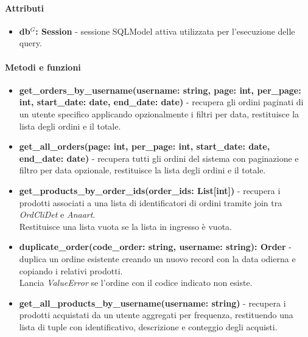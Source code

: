 \paragraph{Attributi}
\begin{itemize}
	\item \textbf{db$^G$: Session} - sessione SQLModel attiva utilizzata per l'esecuzione delle query.
\end{itemize}

\paragraph{Metodi e funzioni}
\begin{itemize}
	\item \textbf{get\_orders\_by\_username(username: string, page: int, per\_page: int, start\_date: date, end\_date: date)} - recupera gli ordini paginati di un utente specifico applicando opzionalmente i filtri per data, restituisce la lista degli ordini e il totale.
	\item \textbf{get\_all\_orders(page: int, per\_page: int, start\_date: date, end\_date: date)} - recupera tutti gli ordini del sistema con paginazione e filtro per data opzionale, restituisce la lista degli ordini e il totale.
	\item \textbf{get\_products\_by\_order\_ids(order\_ids: List[int])} - recupera i prodotti associati a una lista di identificatori di ordini tramite join tra \textit{OrdCliDet} e \textit{Anaart}.\\
	Restituisce una lista vuota se la lista in ingresso è vuota.
	\item \textbf{duplicate\_order(code\_order: string, username: string): Order} - duplica un ordine esistente creando un nuovo record con la data odierna e copiando i relativi prodotti.\\
	Lancia \textit{ValueError} se l'ordine con il codice indicato non esiste.
	\item \textbf{get\_all\_products\_by\_username(username: string)} - recupera i prodotti acquistati da un utente aggregati per frequenza, restituendo una lista di tuple con identificativo, descrizione e conteggio degli acquisti.
\end{itemize}
